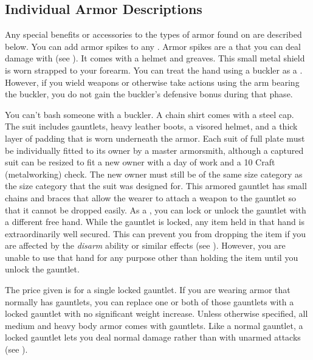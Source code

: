     \subsection{Individual Armor Descriptions}
        Any special benefits or accessories to the types of armor found on  are described below.
         You can add armor spikes to any .
        Armor spikes are a  that you can deal damage with (see ).
         It comes with a helmet and greaves.
         This small metal shield is worn strapped to your forearm.
        You can treat the hand using a buckler as a .
        However, if you wield weapons or otherwise take actions using the arm bearing the buckler, you do not gain the buckler's defensive bonus during that phase.
        \par You can't bash someone with a buckler.
         A chain shirt comes with a steel cap.
         The suit includes gauntlets, heavy leather boots, a visored helmet, and a thick layer of padding that is worn underneath the armor. Each suit of full plate must be individually fitted to its owner by a master armorsmith, although a captured suit can be resized to fit a new owner with a day of work and a  10 Craft (metalworking) check. The new owner must still be of the same size category as the size category that the suit was designed for.
         This armored gauntlet has small chains and braces that allow the wearer to attach a weapon to the gauntlet so that it cannot be dropped easily.
        As a , you can lock or unlock the gauntlet with a different free hand.
        While the gauntlet is locked, any item held in that hand is extraordinarily well secured.
        This can prevent you from dropping the item if you are affected by the \textit{disarm} ability or similar effects (see ).
        However, you are unable to use that hand for any purpose other than holding the item until you unlock the gauntlet.
        \par The price given is for a single locked gauntlet.
        If you are wearing armor that normally has gauntlets, you can replace one or both of those gauntlets with a locked gauntlet with no significant weight increase.
        Unless otherwise specified, all medium and heavy body armor comes with gauntlets.
        Like a normal gauntlet, a locked gauntlet lets you deal normal damage rather than  with unarmed attacks (see ).
